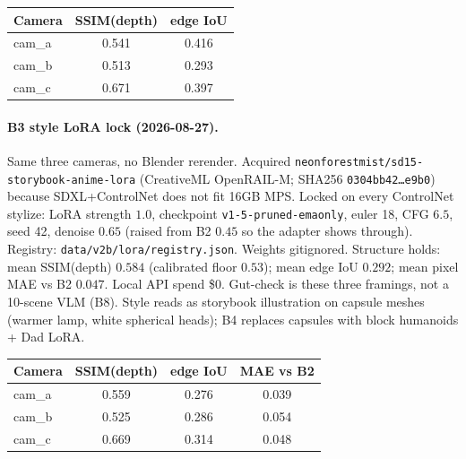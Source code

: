 \documentclass[10pt,twocolumn,letterpaper]{article}
\begin{document}
\begin{center}
\small
\begin{tabular}{lcc}
\toprule
Camera & SSIM(depth) & edge IoU \\
\midrule
cam\_a & 0.541 & 0.416 \\
cam\_b & 0.513 & 0.293 \\
cam\_c & 0.671 & 0.397 \\
\bottomrule
\end{tabular}
\end{center}

\paragraph{B3 style LoRA lock (2026-08-27).}
Same three cameras, no Blender rerender. Acquired \texttt{neonforestmist/sd15-storybook-anime-lora} (CreativeML OpenRAIL-M; SHA256 \texttt{0304bb42\ldots e9b0}) because SDXL+ControlNet does not fit 16GB MPS.
Locked on every ControlNet stylize: LoRA strength $1.0$, checkpoint \texttt{v1-5-pruned-emaonly}, euler 18, CFG $6.5$, seed 42, denoise $0.65$ (raised from B2 $0.45$ so the adapter shows through). Registry: \texttt{data/v2b/lora/registry.json}. Weights gitignored.
Structure holds: mean SSIM(depth) $0.584$ (calibrated floor $0.53$); mean edge IoU $0.292$; mean pixel MAE vs B2 $0.047$. Local API spend \$0.
Gut-check is these three framings, not a 10-scene VLM (B8). Style reads as storybook illustration on capsule meshes (warmer lamp, white spherical heads); B4 replaces capsules with block humanoids + Dad LoRA.

\begin{center}
\small
\begin{tabular}{lccc}
\toprule
Camera & SSIM(depth) & edge IoU & MAE vs B2 \\
\midrule
cam\_a & 0.559 & 0.276 & 0.039 \\
cam\_b & 0.525 & 0.286 & 0.054 \\
cam\_c & 0.669 & 0.314 & 0.048 \\
\bottomrule
\end{tabular}
\end{center}
\end{document}
